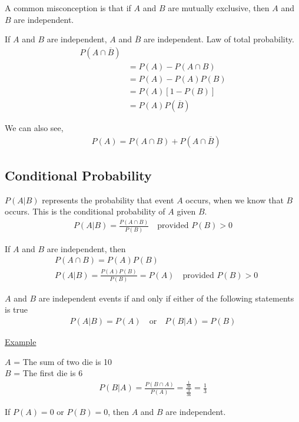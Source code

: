 \documentclass{article}
\begin{document}
A common misconception is that if $A$ and $B$ are mutually exclusive, then $A$ and $B$ are independent.


If $A$ and $B$ are independent, $A$ and $\overline{B}$ are independent. Law of total probability.
\begin{align*}
    P(A \cap \overline{B})\\
    &= P(A) - P(A \cap B) \\
    &= P(A) - P(A)P(B) \\
    &= P(A)[1-P(B)] \\
    &= P(A)P(\overline{B})
\end{align*}

We can also see,
\begin{align*}
    &P(A) = P(A \cap B) + P(A \cap \overline{B})
\end{align*}


\subsection{Conditional Probability}

$P(A|B)$ represents the probability that event $A$ occurs, when we know that $B$ occurs. This is the conditional probability of $A$ given $B$. 
\begin{align*}
    P(A|B) = \frac{P(A \cap B)}{P(B)} \quad \text{provided } P(B) > 0
\end{align*}

If $A$ and $B$ are independent, then
\begin{align*}
    &P(A \cap B) = P(A)P(B)\\
    &P(A|B) = \frac{P(A)P(B)}{P(B)} = P(A) \quad \text{provided } P(B) > 0
\end{align*}

$A$ and $B$ are independent events if and only if either of the following statements is true
\begin{align*}
    P(A|B) = P(A) \quad \text{or} \quad P(B|A) = P(B)
\end{align*}

\underline{Example}

$A$ = The sum of two die is 10\\
$B$ = The first die is 6
\begin{align*}
    P(B|A) = \frac{P(B \cap A)}{P(A)} = \frac{\frac{1}{36}}{\frac{3}{36}} = \frac{1}{3}
\end{align*}

If $P(A) = 0$ or $P(B) = 0$, then $A$ and $B$ are independent. 
\end{document}
